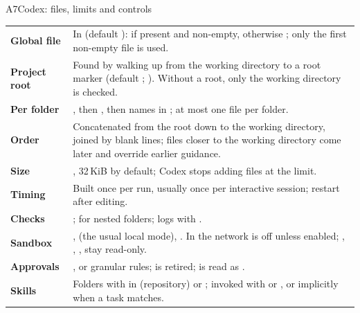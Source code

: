 \begin{frame}[source={OpenAI (2026), Codex documentation and source code: AGENTS.md, configuration, sandboxing, approvals, skills}]{A7\enspace Codex: files, limits and controls}
  \scriptsize\renewcommand\arraystretch{1.2}\setlength\tabcolsep{3pt}
  \begin{tabularx}{\textwidth}{@{}>{\bfseries}L{19mm}X@{}}
    \toprule
    Global file  & In  (default ):  if present and
                   non-empty, otherwise ; only the first non-empty file is used.\\
    Project root & Found by walking up from the working directory to a root marker (default ;
                   ). Without a root, only the working directory is checked.\\
    Per folder   & , then , then names in ;
                   at most one file per folder.\\
    Order        & Concatenated from the root down to the working directory, joined by blank lines; files
                   closer to the working directory come later and override earlier guidance.\\
    Size         & , 32\,KiB by default; Codex stops adding files at the limit.\\
    Timing       & Built once per run, usually once per interactive session; restart after editing.\\
    Checks       & ;
                    for nested folders; logs with .\\
    Sandbox      & ,  (the usual local mode), . In
                    the network is off unless enabled; , , ,
                    stay read-only.\\
    Approvals    & ,  or granular rules;  is retired;  is
                   read as .\\
    Skills       & Folders with  in  (repository) or ;
                   invoked with  or , or implicitly when a task matches.\\
    \bottomrule
  \end{tabularx}
\end{frame}

